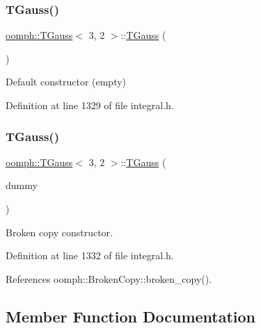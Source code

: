 \subsubsection{\texorpdfstring{T\+Gauss()}{TGauss()}\hspace{0.1cm}{\footnotesize\ttfamily [1/2]}}
{\footnotesize\ttfamily \hyperlink{classoomph_1_1TGauss}{oomph\+::\+T\+Gauss}$<$ 3, 2 $>$\+::\hyperlink{classoomph_1_1TGauss}{T\+Gauss} (\begin{DoxyParamCaption}{ }\end{DoxyParamCaption})\hspace{0.3cm}{\ttfamily [inline]}}



Default constructor (empty) 



Definition at line 1329 of file integral.\+h.

\mbox{\label{classoomph_1_1TGauss_3_013_00_012_01_4_a1b12e70f2b4ae00e5490633914fb2ebe}} 
\subsubsection{\texorpdfstring{T\+Gauss()}{TGauss()}\hspace{0.1cm}{\footnotesize\ttfamily [2/2]}}
{\footnotesize\ttfamily \hyperlink{classoomph_1_1TGauss}{oomph\+::\+T\+Gauss}$<$ 3, 2 $>$\+::\hyperlink{classoomph_1_1TGauss}{T\+Gauss} (\begin{DoxyParamCaption}\item[{const \hyperlink{classoomph_1_1TGauss}{T\+Gauss}$<$ 3, 2 $>$ \&}]{dummy }\end{DoxyParamCaption})\hspace{0.3cm}{\ttfamily [inline]}}



Broken copy constructor. 



Definition at line 1332 of file integral.\+h.



References oomph\+::\+Broken\+Copy\+::broken\+\_\+copy().



\subsection{Member Function Documentation}
\mbox{\label{classoomph_1_1TGauss_3_013_00_012_01_4_a916f0af78f86ae48d821267640d9e1e6}} 
